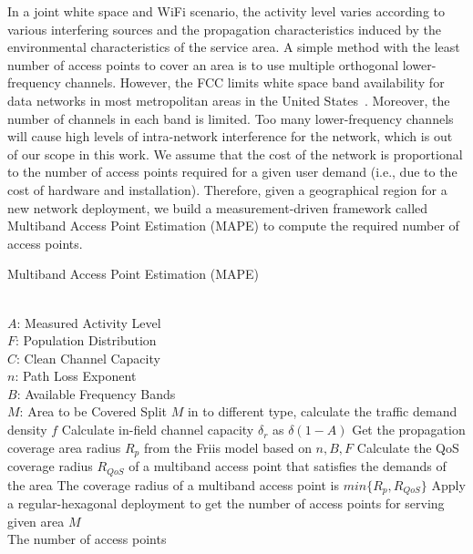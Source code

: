 In a joint white space and WiFi scenario, the activity level varies according to various interfering sources 
and the propagation characteristics induced by the environmental characteristics of the service area. A 
simple method with the least number of access points to cover an area is to use multiple orthogonal 
lower-frequency channels. However, the FCC limits white space band availability for data networks in most 
metropolitan areas in the United States~\cite{googledatabase}. Moreover, the number of channels in each band 
is limited. Too many lower-frequency channels will cause high levels of intra-network interference for the 
network, which is out of our scope in this work. We assume that the cost of the network is proportional to the 
number of access points required for a given user demand (i.e., due to the cost of hardware and installation). 
Therefore, given a geographical region for a new network deployment, we build a measurement-driven framework 
called Multiband Access Point Estimation (MAPE) to compute the required number of access points.


\begin{algorithm}[t]
\small
\caption{Multiband Access Point Estimation (MAPE)}
\label{algorithm:mape}
\begin{algorithmic}[1]
\REQUIRE  ~~\\
$A$: Measured Activity Level \\
$F$: Population Distribution\\
$C$: Clean Channel Capacity\\
$n$: Path Loss Exponent \\
$B$: Available Frequency Bands\\
$M$: Area to be Covered
\STATE Split $M$ in to different type, calculate the traffic demand density $f$
\STATE Calculate in-field channel capacity $\delta_r$ as $\delta(1-A)$
\STATE Get the propagation coverage area radius $R_p$ from the Friis model based on $n,B,F$
\STATE Calculate the QoS coverage radius $R_{QoS}$ of a multiband access point that satisfies the demands of the area
\STATE The coverage radius of a multiband access point is $min\{R_p,R_{QoS}\}$
\STATE Apply a regular-hexagonal deployment to get the number of access points for serving given area $M$
\ENSURE ~~\\
The number of access points\\
\end{algorithmic}
\end{algorithm}

